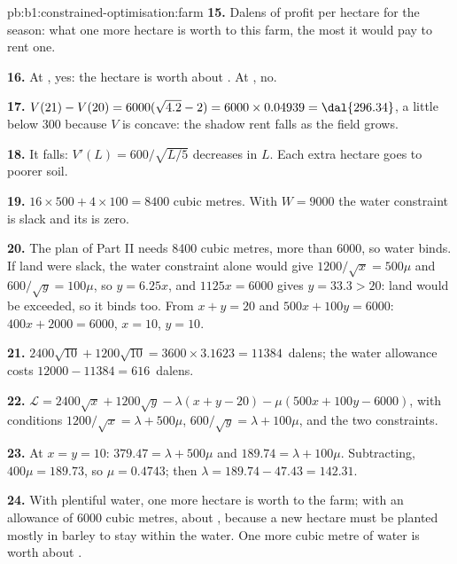 \begin{solution}{pb:b1:constrained-optimisation:farm}
\textbf{15.} Dalens of profit per hectare for the season: what one more
hectare is worth to this farm, the most it would pay to rent one.

\textbf{16.} At , yes: the hectare is worth about . At
, no.

\textbf{17.} $V(21) - V(20) = 6000(\sqrt{4.2} - 2) = 6000 \times 0.04939 =
\dal{296.34}$, a little below 300 because $V$ is concave: the shadow rent
falls as the field grows.

\textbf{18.} It falls: $V'(L) = 600/\sqrt{L/5}$ decreases in $L$. Each extra
hectare goes to poorer soil.

\textbf{19.} $16 \times 500 + 4 \times 100 = 8400$ cubic metres. With
$W = 9000$ the water constraint is slack and its  is zero.

\textbf{20.} The plan of Part II needs 8400 cubic metres, more than 6000, so
water binds. If land were slack, the water constraint alone would give
$1200/\sqrt x = 500\mu$ and $600/\sqrt y = 100\mu$, so $y = 6.25x$, and
$1125x = 6000$ gives $y = 33.3 > 20$: land would be exceeded, so it binds
too. From $x + y = 20$ and $500x + 100y = 6000$: $400x + 2000 = 6000$,
$x = 10$, $y = 10$.

\textbf{21.} $2400\sqrt{10} + 1200\sqrt{10} = 3600 \times 3.1623 = \num{11384}$~dalens;
the water allowance costs $12000 - 11384 = \num{616}$~dalens.

\textbf{22.} $\mathcal L = 2400\sqrt x + 1200\sqrt y - \lambda(x + y - 20) -
\mu(500x + 100y - 6000)$, with conditions $1200/\sqrt x = \lambda + 500\mu$,
$600/\sqrt y = \lambda + 100\mu$, and the two constraints.

\textbf{23.} At $x = y = 10$: $379.47 = \lambda + 500\mu$ and
$189.74 = \lambda + 100\mu$. Subtracting, $400\mu = 189.73$, so
$\mu = 0.4743$; then $\lambda = 189.74 - 47.43 = 142.31$.

\textbf{24.} With plentiful water, one more hectare is worth  to the
farm; with an allowance of 6000 cubic metres, about , because a new
hectare must be planted mostly in barley to stay within the water. One more
cubic metre of water is worth about .
\end{solution}
